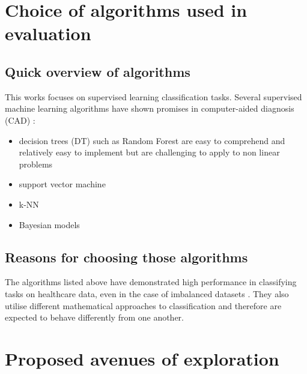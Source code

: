 \section{Choice of algorithms used in evaluation}
\subsection{Quick overview of algorithms}
This works focuses on supervised learning classification tasks. Several supervised machine learning algorithms have shown promises in computer-aided diagnosis (CAD) \citep{Dua:2014dz}:
\begin{itemize}
    \item decision trees (DT) such as Random Forest are easy to comprehend and relatively easy to implement but are challenging to apply to non linear problems \citep{Gray:2013eh}
    \item support vector machine \citep{Naraei:ct}
    \item k-NN \citep{Liu:2011dz}
    \item Bayesian models \citep{Dangare:ut}
\end{itemize}

\subsection{Reasons for choosing those algorithms}
The algorithms listed above have demonstrated high performance in classifying tasks on healthcare data, even in the case of imbalanced datasets \citep{Dua:2014dz}. They also utilise different mathematical approaches to classification and therefore are expected to behave differently from one another.



\section{Proposed avenues of exploration}
